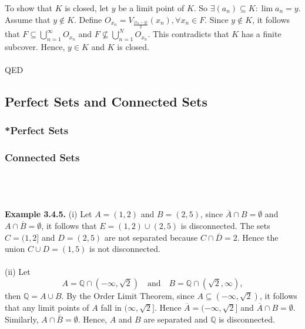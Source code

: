\documentclass{article}
\begin{document}
            To show that $K$ is closed, let $y$ be a limit point of $K$. So $\exists (a_n) \subseteq K: \lim a_n = y$. Assume that $y \notin K$. Define $O_{x_n} = V_{\frac{|x_n-y|}{2}}(x_n), \forall x_n \in F$. Since $y \notin K$, it follows that $F \subseteq \bigcup_{n=1}^\infty O_{x_n}$ and $F \nsubseteq \bigcup_{n=1}^N O_{x_n}$. This contradicts that $K$ has a finite subcover. Hence, $y \in K$ and $K$ is closed.
            \\ \\
            QED
            
            \subsection{Perfect Sets and Connected Sets}
            \subsubsection{*Perfect Sets}
            \subsubsection{Connected Sets}
            \\ \\ \\
            \textbf{Example 3.4.5.} (i) Let $A = (1,2)$ and $B=(2,5)$, since $\overline{A} \cap B = \emptyset$ and $A \cap \overline{B} = \emptyset$, it follows that $E = (1,2) \cup (2,5)$ is disconnected. The sets $C = (1,2]$ and $D = (2,5)$ are not separated because $C \cap \overline{D} = {2}$. Hence the union $C \cup D = (1,5)$ is not disconnected.
            \\ \\
            (ii) Let
            \begin{equation*}
                A = \mathbb{Q} \cap (-\infty, \sqrt{2}) \quad \text{and} \quad B = \mathbb{Q} \cap (\sqrt{2}, \infty),
            \end{equation*}
            then $\mathbb{Q} = A \cup B$. By the Order Limit Theorem, since $A \subseteq (-\infty, \sqrt{2})$, it follows that any limit points of $A$ fall in $(\infty, \sqrt{2}]$. Hence $\overline{A} = (-\infty, \sqrt{2}]$ and $\overline{A} \cap B = \emptyset$. Similarly, $A \cap \overline{B} = \emptyset$. Hence, $A$ and $B$ are separated and $\mathbb{Q}$ is disconnected.
            \\
            
\end{document}

